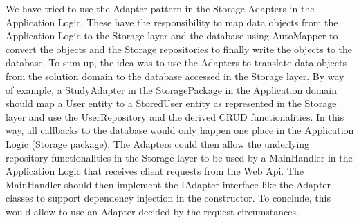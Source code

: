 We have tried to use the Adapter pattern in the Storage Adapters in the Application Logic. These have the responsibility to map data objects from the Application Logic to the Storage layer and the database using AutoMapper to convert the objects and the Storage repositories to finally write the objects to the database. To sum up, the idea was to use the Adapters to translate data objects from the solution domain to the database accessed in the Storage layer. By way of example, a StudyAdapter in the StoragePackage in the Application domain should map a User entity to a StoredUser entity as represented in the Storage layer and use the UserRepository and the derived CRUD functionalities. In this way, all callbacks to the database would only happen one place in the Application Logic (Storage package). The Adapters could then allow the underlying repository functionalities in the Storage layer to be used by a MainHandler in the Application Logic that receives client requests from the Web Api. The MainHandler should then implement the IAdapter interface like the Adapter classes to support dependency injection in the constructor. To conclude, this would allow to use an Adapter decided by the request circumstances. 

